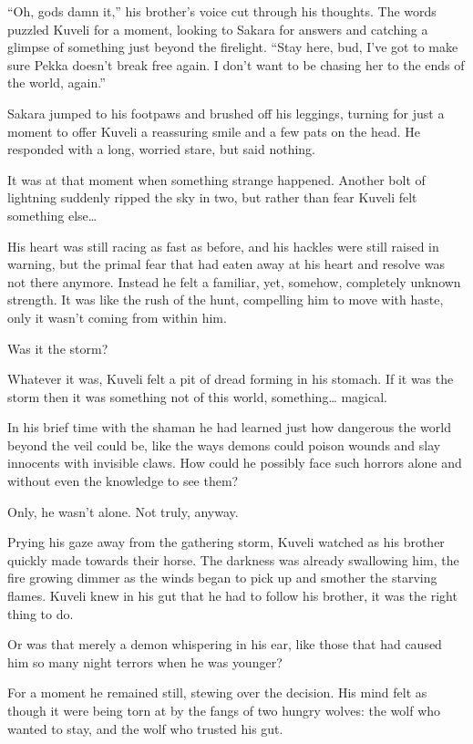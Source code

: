 ``Oh, gods damn it,'' his brother's voice cut through his thoughts. The words puzzled Kuveli for a moment, looking to Sakara for answers and catching a glimpse of something just beyond the firelight. ``Stay here, bud, I've got to make sure Pekka doesn't break free again. I don't want to be chasing her to the ends of the world, again.''

Sakara jumped to his footpaws and brushed off his leggings, turning for just a moment to offer Kuveli a reassuring smile and a few pats on the head. He responded with a long, worried stare, but said nothing.

It was at that moment when something strange happened. Another bolt of lightning suddenly ripped the sky in two, but rather than fear Kuveli felt something else\ldots{}

His heart was still racing as fast as before, and his hackles were still raised in warning, but the primal fear that had eaten away at his heart and resolve was not there anymore. Instead he felt a familiar, yet, somehow, completely unknown strength. It was like the rush of the hunt, compelling him to move with haste, only it wasn't coming from within him.

Was it the storm?

Whatever it was, Kuveli felt a pit of dread forming in his stomach. If it was the storm then it was something not of this world, something\ldots{} magical.

In his brief time with the shaman he had learned just how dangerous the world beyond the veil could be, like the ways demons could poison wounds and slay innocents with invisible claws. How could he possibly face such horrors alone and without even the knowledge to see them?

Only, he wasn't alone. Not truly, anyway.

Prying his gaze away from the gathering storm, Kuveli watched as his brother quickly made towards their horse. The darkness was already swallowing him, the fire growing dimmer as the winds began to pick up and smother the starving flames. Kuveli knew in his gut that he had to follow his brother, it was the right thing to do.

Or was that merely a demon whispering in his ear, like those that had caused him so many night terrors when he was younger?

For a moment he remained still, stewing over the decision. His mind felt as though it were being torn at by the fangs of two hungry wolves: the wolf who wanted to stay, and the wolf who trusted his gut.

